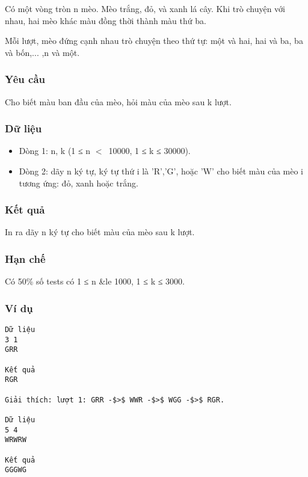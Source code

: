 

Có một vòng tròn n mèo. Mèo trắng, đỏ, và xanh lá cây. Khi trò chuyện với nhau, hai mèo khác màu đồng thời thành màu thứ ba.

Mỗi lượt, mèo đứng cạnh nhau trò chuyện theo thứ tự: một và hai, hai và ba, ba và bốn,... ,n và một.

\subsubsection{Yêu cầu}

Cho biết màu ban đầu của mèo, hỏi màu của mèo sau k lượt.

\subsubsection{Dữ liệu}
\begin{itemize}
	\item Dòng 1: n, k (1 ≤ n $<$ 10000, 1 ≤ k ≤ 30000).
	\item Dòng 2: dãy n ký tự, ký tự thứ i là 'R','G', hoặc 'W' cho biết màu của mèo i tương ứng: đỏ, xanh hoặc trắng.
\end{itemize}

\subsubsection{Kết quả}

In ra dãy n ký tự cho biết màu của mèo sau k lượt.

\subsubsection{Hạn chế}

Có 50\% số tests có 1 ≤ n \&le 1000, 1 ≤ k ≤ 3000.

\subsubsection{Ví dụ}
\begin{verbatim}
Dữ liệu
3 1
GRR

Kết quả 
RGR

Giải thích: lượt 1: GRR -$>$ WWR -$>$ WGG -$>$ RGR.

Dữ liệu
5 4
WRWRW

Kết quả 
GGGWG
\end{verbatim}